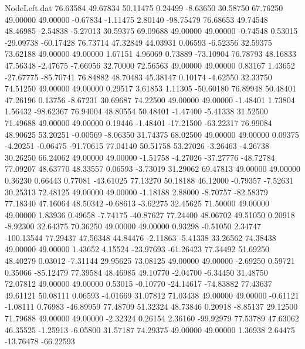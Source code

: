 \begin{filecontents}{NodeLeft.dat}
  76.63584   49.67834   50.11475     0.24499   -8.63650   30.58750   67.76250   49.00000   49.00000   -0.67834   -1.11475    2.80140  -98.75479
  76.68653   49.74548   48.46985    -2.54838   -5.27013   30.59375   69.09688   49.00000   49.00000   -0.74548    0.53015  -29.09738  -60.17428
  76.73714   47.32849   44.03931     0.06593   -6.52356   32.59375   73.62188   49.00000   49.00000    1.67151    4.96069    0.73889  -73.10904
  76.78793   48.16833   47.56348    -2.47675   -7.66956   32.70000   72.56563   49.00000   49.00000    0.83167    1.43652  -27.67775  -85.70741
  76.84882   48.70483   45.38147     0.10174   -4.62550   32.33750   74.51250   49.00000   49.00000    0.29517    3.61853    1.11305  -50.60180
  76.89948   50.48401   47.26196     0.13756   -8.67231   30.69687   74.22500   49.00000   49.00000   -1.48401    1.73804    1.56432  -98.62367
  76.94004   48.80554   50.48401    -1.47400   -5.41338   31.52500   71.49688   49.00000   49.00000    0.19446   -1.48401  -17.21500  -63.22317
  76.99084   48.90625   53.20251    -0.00569   -8.06350   31.74375   68.02500   49.00000   49.00000    0.09375   -4.20251   -0.06475  -91.70615
  77.04140   50.51758   53.27026    -3.26463   -4.26738   30.26250   66.24062   49.00000   49.00000   -1.51758   -4.27026  -37.27776  -48.72784
  77.09207   48.63770   48.33557     0.06593   -3.73019   31.29062   69.47813   49.00000   49.00000    0.36230    0.66443    0.77081  -43.61025
  77.13270   50.18188   46.12000    -0.79357   -7.52631   30.25313   72.48125   49.00000   49.00000   -1.18188    2.88000   -8.70757  -82.58379
  77.18340   47.16064   48.50342    -0.68613   -3.62275   32.45625   71.50000   49.00000   49.00000    1.83936    0.49658   -7.74175  -40.87627
  77.24400   48.06702   49.51050     0.20918   -8.92300   32.64375   70.36250   49.00000   49.00000    0.93298   -0.51050    2.34747 -100.13544
  77.29437   47.56348   44.84476    -2.11863   -5.41338   33.26562   74.38438   49.00000   49.00000    1.43652    4.15524  -23.97693  -61.26423
  77.34492   51.69250   48.40279     0.03012   -7.31144   29.95625   73.08125   49.00000   49.00000   -2.69250    0.59721    0.35066  -85.12479
  77.39584   48.46985   49.10770    -2.04700   -6.34450   31.48750   72.07812   49.00000   49.00000    0.53015   -0.10770  -24.14617  -74.83882
  77.43637   49.61121   50.08111     0.06593   -4.01669   31.07812   71.03438   49.00000   49.00000   -0.61121   -1.08111    0.76983  -46.89959
  77.48709   51.32324   48.73846     0.20918   -8.85137   29.12500   71.79688   49.00000   49.00000   -2.32324    0.26154    2.36160  -99.92979
  77.53789   47.63062   46.35525    -1.25913   -6.05800   31.57187   74.29375   49.00000   49.00000    1.36938    2.64475  -13.76478  -66.22593

\end{filecontents}
